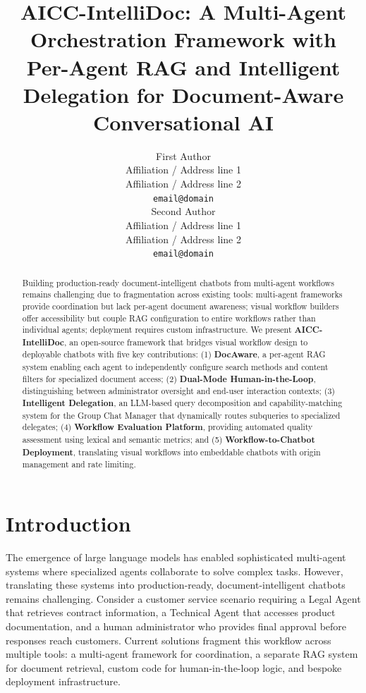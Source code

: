 \documentclass[11pt]{article}
\title{AICC-IntelliDoc: A Multi-Agent Orchestration Framework with\\Per-Agent RAG and Intelligent Delegation for Document-Aware Conversational AI}
\author{First Author \\
  Affiliation / Address line 1 \\
  Affiliation / Address line 2 \\
  \texttt{email@domain} \\\And
  Second Author \\
  Affiliation / Address line 1 \\
  Affiliation / Address line 2 \\
  \texttt{email@domain} \\}
\begin{document}
\maketitle

\begin{abstract}
Building production-ready document-intelligent chatbots from multi-agent workflows remains challenging due to fragmentation across existing tools: multi-agent frameworks provide coordination but lack per-agent document awareness; visual workflow builders offer accessibility but couple RAG configuration to entire workflows rather than individual agents; deployment requires custom infrastructure. We present \textbf{AICC-IntelliDoc}, an open-source framework that bridges visual workflow design to deployable chatbots with five key contributions: (1) \textbf{DocAware}, a per-agent RAG system enabling each agent to independently configure search methods and content filters for specialized document access; (2) \textbf{Dual-Mode Human-in-the-Loop}, distinguishing between administrator oversight and end-user interaction contexts; (3) \textbf{Intelligent Delegation}, an LLM-based query decomposition and capability-matching system for the Group Chat Manager that dynamically routes subqueries to specialized delegates; (4) \textbf{Workflow Evaluation Platform}, providing automated quality assessment using lexical and semantic metrics; and (5) \textbf{Workflow-to-Chatbot Deployment}, translating visual workflows into embeddable chatbots with origin management and rate limiting.
\end{abstract}

\section{Introduction}

The emergence of large language models has enabled sophisticated multi-agent systems where specialized agents collaborate to solve complex tasks. However, translating these systems into production-ready, document-intelligent chatbots remains challenging. Consider a customer service scenario requiring a Legal Agent that retrieves contract information, a Technical Agent that accesses product documentation, and a human administrator who provides final approval before responses reach customers. Current solutions fragment this workflow across multiple tools: a multi-agent framework for coordination, a separate RAG system for document retrieval, custom code for human-in-the-loop logic, and bespoke deployment infrastructure.
\end{document}
